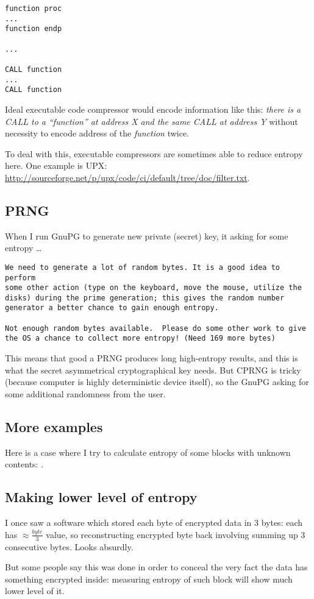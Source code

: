 \begin{lstlisting}[style=customasmx86]
function proc
...
function endp

...

CALL function
...
CALL function
\end{lstlisting}

Ideal executable code compressor would encode information like this:
\emph{there is a CALL to a ``function'' at address X and the same CALL at address Y} without necessity to encode
address of the \emph{function} twice.

To deal with this, executable compressors are sometimes able to reduce entropy here.
One example is UPX: \url{http://sourceforge.net/p/upx/code/ci/default/tree/doc/filter.txt}.

\subsection{\ac{PRNG}}

When I run GnuPG to generate new private (secret) key, it asking for some entropy \dots

\begin{lstlisting}
We need to generate a lot of random bytes. It is a good idea to perform
some other action (type on the keyboard, move the mouse, utilize the
disks) during the prime generation; this gives the random number
generator a better chance to gain enough entropy.

Not enough random bytes available.  Please do some other work to give
the OS a chance to collect more entropy! (Need 169 more bytes)
\end{lstlisting}

This means that good a \ac{PRNG} produces long high-entropy results,
and this is what the secret asymmetrical cryptographical key needs.
But \ac{CPRNG} is tricky (because computer is highly deterministic device itself),
so the GnuPG asking for some additional randomness from the user.

\subsection{More examples}

Here is a case where I try to calculate entropy of some blocks with unknown contents: .



\subsection{Making lower level of entropy}

I once saw a software which stored each byte of encrypted data in 3 bytes:
each has {\Large $\approx \frac{byte}{3}$} value, so reconstructing encrypted byte back involving summing up 3 consecutive bytes.
Looks absurdly.

But some people say this was done in order to conceal the very fact
the data has something encrypted inside: measuring entropy of such block will show much lower level of it.

